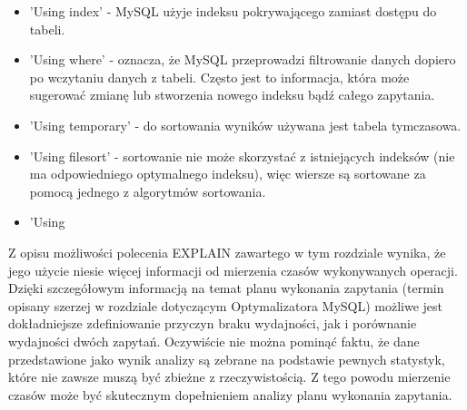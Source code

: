 \begin{itemize}
	\item 'Using index' - MySQL użyje indeksu pokrywającego zamiast dostępu do tabeli.
	\item 'Using where' - oznacza, że MySQL przeprowadzi filtrowanie danych dopiero po wczytaniu danych z tabeli. Często jest to informacja, która może sugerować zmianę lub stworzenia nowego indeksu bądź całego zapytania.
	\item 'Using temporary' - do sortowania wyników używana jest tabela tymczasowa.
	\item 'Using filesort' - sortowanie nie może skorzystać z istniejących indeksów (nie ma odpowiedniego optymalnego indeksu), więc wiersze są sortowane za pomocą jednego z algorytmów sortowania.
	\item 'Using 
	
\end{itemize}

\hfill \break
\hfill \break
\hfill \break
\hfill \break
\hfill \break


Z opisu możliwości polecenia EXPLAIN zawartego w tym rozdziale wynika, że jego użycie niesie więcej informacji od mierzenia czasów wykonywanych operacji. Dzięki szczegółowym informacją na temat planu wykonania zapytania (termin opisany szerzej w rozdziale dotyczącym Optymalizatora MySQL) możliwe jest dokładniejsze zdefiniowanie przyczyn braku wydajności, jak i porównanie wydajności dwóch zapytań. Oczywiście nie można pominąć faktu, że dane przedstawione jako wynik analizy są zebrane na podstawie pewnych statystyk, które nie zawsze muszą być zbieżne z rzeczywistością. Z tego powodu mierzenie czasów może być skutecznym dopełnieniem analizy planu wykonania zapytania.